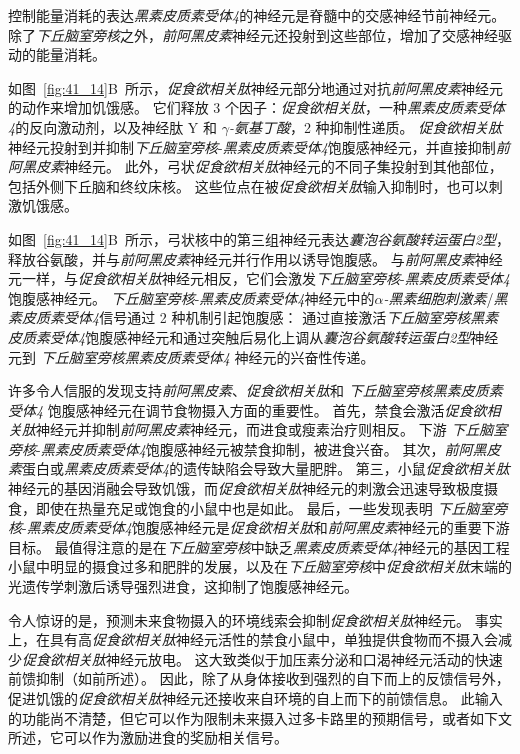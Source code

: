 控制能量消耗的表达\textit{黑素皮质素受体4}的神经元是脊髓中的交感神经节前神经元。
除了\textit{下丘脑室旁核}之外，\textit{前阿黑皮素}神经元还投射到这些部位，增加了交感神经驱动的能量消耗。


如图~\ref{fig:41_14}B~所示，\textit{促食欲相关肽}神经元部分地通过对抗\textit{前阿黑皮素}神经元的动作来增加饥饿感。
它们释放 3 个因子：\textit{促食欲相关肽}，一种\textit{黑素皮质素受体4}的反向激动剂，以及神经肽 Y 和 \textit{$ \gamma $-氨基丁酸}，2 种抑制性递质。
\textit{促食欲相关肽}神经元投射到并抑制\textit{下丘脑室旁核}-\textit{黑素皮质素受体4}饱腹感神经元，并直接抑制\textit{前阿黑皮素}神经元。
此外，弓状\textit{促食欲相关肽}神经元的不同子集投射到其他部位，包括外侧下丘脑和终纹床核。
这些位点在被\textit{促食欲相关肽}输入抑制时，也可以刺激饥饿感。


如图~\ref{fig:41_14}B~所示，弓状核中的第三组神经元表达\textit{囊泡谷氨酸转运蛋白2型}，释放谷氨酸，并与\textit{前阿黑皮素}神经元并行作用以诱导饱腹感。
与\textit{前阿黑皮素}神经元一样，与\textit{促食欲相关肽}神经元相反，它们会激发\textit{下丘脑室旁核}-\textit{黑素皮质素受体4}饱腹感神经元。
\textit{下丘脑室旁核}-\textit{黑素皮质素受体4}神经元中的\textit{$\alpha$-黑素细胞刺激素}/\textit{黑素皮质素受体4}信号通过 2 种机制引起饱腹感：
通过直接激活\textit{下丘脑室旁核}\textit{黑素皮质素受体4}饱腹感神经元和通过突触后易化上调从\textit{囊泡谷氨酸转运蛋白2型}神经元到 \textit{下丘脑室旁核}\textit{黑素皮质素受体4} 神经元的兴奋性传递。


许多令人信服的发现支持\textit{前阿黑皮素}、\textit{促食欲相关肽}和 \textit{下丘脑室旁核}\textit{黑素皮质素受体4} 饱腹感神经元在调节食物摄入方面的重要性。
首先，禁食会激活\textit{促食欲相关肽}神经元并抑制\textit{前阿黑皮素}神经元，而进食或瘦素治疗则相反。
下游 \textit{下丘脑室旁核}-\textit{黑素皮质素受体4}饱腹感神经元被禁食抑制，被进食兴奋。
其次，\textit{前阿黑皮素}蛋白或\textit{黑素皮质素受体4}的遗传缺陷会导致大量肥胖。
第三，小鼠\textit{促食欲相关肽}神经元的基因消融会导致饥饿，而\textit{促食欲相关肽}神经元的刺激会迅速导致极度摄食，即使在热量充足或饱食的小鼠中也是如此。
最后，一些发现表明 \textit{下丘脑室旁核}-\textit{黑素皮质素受体4}饱腹感神经元是\textit{促食欲相关肽}和\textit{前阿黑皮素}神经元的重要下游目标。
最值得注意的是在\textit{下丘脑室旁核}中缺乏\textit{黑素皮质素受体4}神经元的基因工程小鼠中明显的摄食过多和肥胖的发展，以及在\textit{下丘脑室旁核}中\textit{促食欲相关肽}末端的光遗传学刺激后诱导强烈进食，这抑制了饱腹感神经元。


令人惊讶的是，预测未来食物摄入的环境线索会抑制\textit{促食欲相关肽}神经元。
事实上，在具有高\textit{促食欲相关肽}神经元活性的禁食小鼠中，单独提供食物而不摄入会减少\textit{促食欲相关肽}神经元放电。
这大致类似于加压素分泌和口渴神经元活动的快速前馈抑制（如前所述）。
因此，除了从身体接收到强烈的自下而上的反馈信号外，促进饥饿的\textit{促食欲相关肽}神经元还接收来自环境的自上而下的前馈信息。
此输入的功能尚不清楚，但它可以作为限制未来摄入过多卡路里的预期信号，或者如下文所述，它可以作为激励进食的奖励相关信号。


